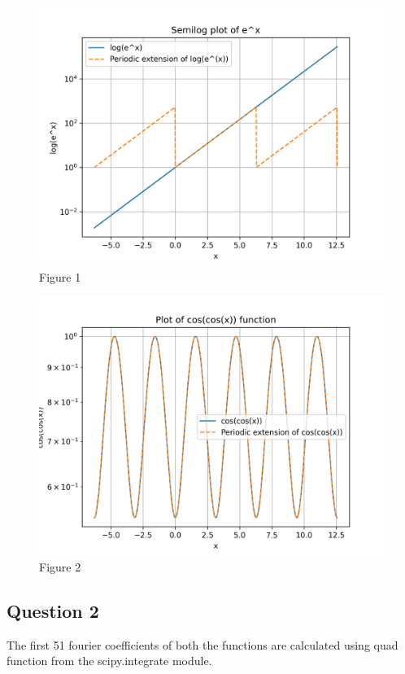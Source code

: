 \documentclass[11pt, a4paper]{article}
\begin{document}
\begin{figure}[!tbh]
\centering
\includegraphics[scale=0.6]{assn4_plot1.png}
\caption{Figure 1}
\label{fig:plot1}
\end{figure} 

\begin{figure}[!tbh]
\centering
\includegraphics[scale=0.6]{assn4_plot2.png}
\caption{Figure 2}
\label{fig:plot2}
\end{figure} 

\subsection*{Question 2}
The first 51 fourier coefficients of both the functions are calculated using quad function from the scipy.integrate module.

\end{document}
